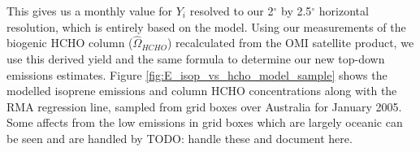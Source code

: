 \documentclass[acp, manuscript]{copernicus} %
\begin{document}
    This gives us a monthly value for $Y_i$ resolved to our 2$^{\circ}$ by 2.5$^{\circ}$ horizontal resolution, which is entirely based on the model.
    Using our measurements of the biogenic HCHO column ($\hat{\Omega}_{HCHO}$) recalculated from the OMI satellite product, we use this derived yield and the same formula to determine our new top-down emissions estimates.
    Figure \ref{fig:E_isop_vs_hcho_model_sample} shows the modelled isoprene emissions and column HCHO concentrations along with the RMA regression line, sampled from grid boxes over Australia for January 2005.
    Some affects from the low emissions in grid boxes which are largely oceanic can be seen and are handled by TODO: handle these and document here.
    
\end{document}

